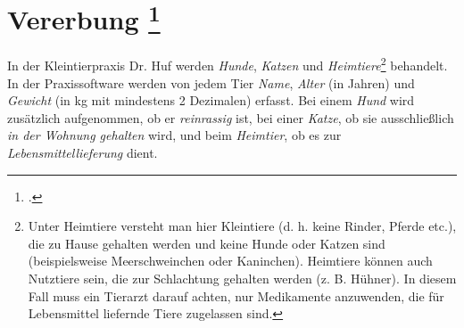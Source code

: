 \documentclass{lehramt-informatik-aufgabe}
\begin{document}

\section{Vererbung
\footcite{oomup:ab:5}}

In der Kleintierpraxis Dr. Huf werden \emph{Hunde}, \emph{Katzen} und
\emph{Heimtiere}\footnote{Unter Heimtiere versteht man hier Kleintiere
(d. h. keine Rinder, Pferde etc.), die zu Hause gehalten werden und
keine Hunde oder Katzen sind (beispielsweise Meerschweinchen oder
Kaninchen). Heimtiere können auch Nutztiere sein, die zur Schlachtung
gehalten werden (z. B. Hühner). In diesem Fall muss ein Tierarzt darauf
achten, nur Medikamente anzuwenden, die für Lebensmittel liefernde Tiere
zugelassen sind.} behandelt. In der Praxissoftware werden von jedem Tier
\emph{Name}, \emph{Alter} (in Jahren) und \emph{Gewicht} (in kg mit
mindestens 2 Dezimalen) erfasst. Bei einem \emph{Hund} wird zusätzlich
aufgenommen, ob er \emph{reinrassig} ist, bei einer \emph{Katze}, ob sie
ausschließlich \emph{in der Wohnung gehalten} wird, und beim
\emph{Heimtier}, ob es zur \emph{Lebensmittellieferung} dient.
\end{document}

